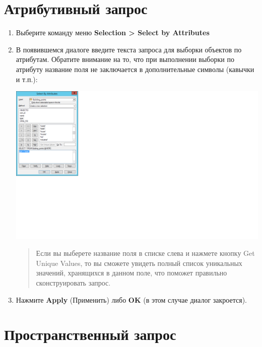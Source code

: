 \documentclass[12pt,]{book}
\begin{document}
\hypertarget{manual-select-attribute}{%
\section{Атрибутивный запрос}\label{manual-select-attribute}}

\begin{enumerate}
\def\labelenumi{\arabic{enumi}.}
\item
  Выберите команду меню \textbf{Selection \textgreater{} Select by Attributes}
\item
  В появившемся диалоге введите текста запроса для выборки объектов по атрибутам. Обратите внимание на то, что при выполнении выборки по атрибуту название поля не заключается в дополнительные символы (кавычки и т.п.):

  \includegraphics{images/Appendix/image99.png}

  \begin{quote}
  Если вы выберете название поля в списке слева и нажмете кнопку Get Unique Values, то вы сможете увидеть полный список уникальных значений, хранящихся в данном поле, что поможет правильно сконструировать запрос.
  \end{quote}
\item
  Нажмите \textbf{Apply} (Применить) либо \textbf{OK} (в этом случае диалог закроется).
\end{enumerate}

\hypertarget{manual-select-location}{%
\section{Пространственный запрос}\label{manual-select-location}}
\end{document}
